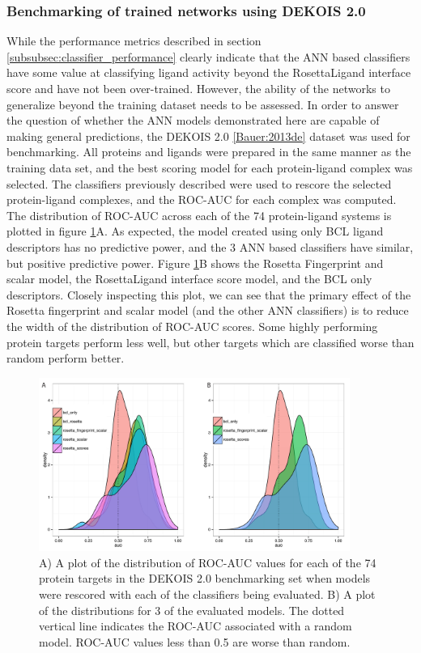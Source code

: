 \subsubsection{Benchmarking of trained networks using DEKOIS 2.0}
While the performance metrics described in section \ref{subsubsec:classifier_performance} clearly indicate that the ANN based classifiers have some value at classifying ligand activity beyond the RosettaLigand interface score and have not been over-trained.
However, the ability of the networks to generalize beyond the training dataset needs to be assessed.
In order to answer the question of whether the ANN models demonstrated here are capable of making general predictions, the DEKOIS 2.0 \ref{Bauer:2013de} dataset was used for benchmarking. 
All proteins and ligands were prepared in the same manner as the training data set, and the best scoring model for each protein-ligand complex was selected.
The classifiers previously described were used to rescore the selected protein-ligand complexes, and the ROC-AUC for each complex was computed. 
The distribution of ROC-AUC across each of the 74 protein-ligand systems is plotted in figure \ref{fig:dekois_roc_all}A.
As expected, the model created using only BCL ligand descriptors has no predictive power, and the 3 ANN based classifiers have similar, but positive predictive power.
Figure \ref{fig:dekois_roc_all}B shows the Rosetta Fingerprint and scalar model, the RosettaLigand interface score model, and the BCL only descriptors.
Closely inspecting this plot, we can see that the primary effect of the Rosetta fingerprint and scalar model (and the other ANN classifiers) is to reduce the width of the distribution of ROC-AUC scores.  Some highly performing protein targets perform less well, but other targets which are classified worse than random perform better. 

\begin{figure}
\centering
\includegraphics[width=4in]{figures/hts/auc_distributions.pdf}
\caption{
A) A plot of the distribution of ROC-AUC values for each of the 74 protein targets in the DEKOIS 2.0 benchmarking set when models were rescored with each of the classifiers being evaluated.
B) A plot of the distributions for 3 of the evaluated models.
The dotted vertical line indicates the ROC-AUC associated with a random model.
ROC-AUC values less than 0.5 are worse than random. 
}
\label{fig:dekois_roc_all}
\end{figure}

